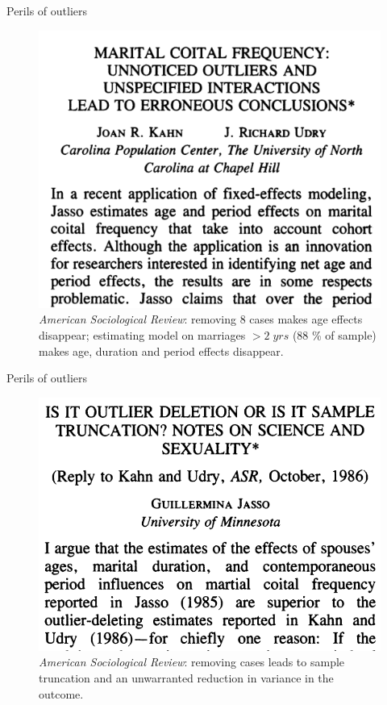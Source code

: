 \documentclass[12pt,english,pdf,xcolor=dvipsnames,aspectratio=169,handout]{beamer}\usepackage[]{graphicx}\usepackage[]{xcolor}
\begin{document}
\begin{frame}{Perils of outliers}

\begin{figure}
\centering
\includegraphics[scale=0.45]{../04-graphs/05-06}
\caption{\textit{American Sociological Review}: removing 8 cases makes age effects disappear; estimating model on marriages $>2\; yrs$ (88 \% of sample) makes age, duration and period effects disappear.}
\end{figure}

\end{frame}



\begin{frame}{Perils of outliers}

\begin{figure}
\centering
\includegraphics[scale=0.40]{../04-graphs/05-07}
\caption{\textit{American Sociological Review}: removing cases leads to sample truncation and an unwarranted reduction in variance in the outcome.}
\end{figure}

\end{frame}
\end{document}
